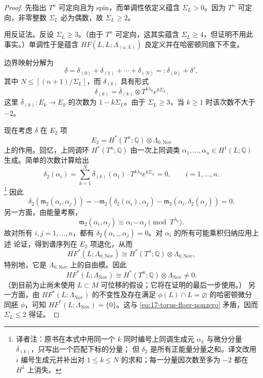 \begin{proof}
先指出 $T^n$ 可定向且为 spin，而单调性依定义蕴含 $\Sigma_L>0$。因为 $T^n$
可定向，非零整数 $\Sigma_L$ 必为偶数，故 $\Sigma_L\geq2$。

用反证法。反设 $\Sigma_L\geq3$。（由于 $T^n$ 可定向，这其实蕴含
$\Sigma_L\geq4$，但证明不用此事实。）单调性于是蕴含
$HF(L,L;\Lambda_{(\omega,L)})$ 良定义并在哈密顿同痕下不变。

边界映射分解为
\[
 \delta=\delta_{(0)}+\delta_{(1)}+\cdots+\delta_{(N)}
 =:\delta_{(0)}+\delta',
\]
其中 $N\leq[(n+1)/\Sigma_L]$，而 $\delta_{(k)}$ 具有形式
\begin{equation}
 \delta_{(k)}=\overline\delta_{(k)}\otimes T^{k\lambda_0}e^{k\Sigma_L}.
\label{eq:17-delta-k-monotone-torus}
\end{equation}
这里 $\overline\delta_{(k)}:E_k\to E_k$ 的次数为 $1-k\Sigma_L$。由于
$\Sigma_L\geq3$，当 $k\geq1$ 时该次数不大于 $-2$。

现在考虑 $\delta$ 在 $E_2$ 项
\[
 E_2=H^*(T^n;\mathbb Q)\otimes\Lambda_{0,\mathrm{Nov}}
\]
上的作用。回忆，上同调环 $H^*(T^n;\mathbb Q)$ 由一次上同调类
$\alpha_1,\ldots,\alpha_n\in H^1(L;\mathbb Q)$ 生成。简单的次数计算给出
\[
 \delta_2(\alpha_i)=\sum_{k=1}^{N}\overline\delta_{(k)}(\alpha_i)
 \cdot T^{k\lambda_0}e^{k\Sigma_L}=0,
 \qquad i=1,\ldots,n.
\]
\footnote{译者注：原书在本式中用同一个 $k$ 同时编号上同调生成元
$\alpha_k$ 与微分分量 $\overline\delta_{(k)}$，只写出一个匹配下标的分量；
但 $\delta_2$ 是所有正能量分量之和。译文改用 $i$ 编号生成元并补出对
$1\leq k\leq N$ 的求和；每一分量因次数至多为 $-2$ 都在 $H^1$ 上消失。}
因此
\[
 \delta_2(\mathfrak m_2(\alpha_i,\alpha_j))
 =-\mathfrak m_2(\delta_2(\alpha_i),\alpha_j)
 -\mathfrak m_2(\alpha_i,\delta_2(\alpha_j))=0.
\]
另一方面，由能量考察，
\[
 \mathfrak m_2(\alpha_i,\alpha_j)\equiv
 \alpha_i\smile\alpha_j\pmod{T^{\lambda_0}}.
\]
故对所有 $i,j=1,\ldots,n$，都有
$\delta_2(\alpha_i\smile\alpha_j)=0$。对 $\alpha_i$ 的所有可能乘积归纳应用上述
论证，得到谱序列在 $E_2$ 项退化，从而
\[
 HF^*(L;\Lambda_{0,\mathrm{Nov}})
 \cong H^*(T^n;\mathbb Q)\otimes\Lambda_{0,\mathrm{Nov}},
\]
特别地，它是 $\Lambda_{0,\mathrm{Nov}}$ 上的自由模。因此
\begin{equation}
 HF^*(L;\Lambda_{\mathrm{Nov}})
 \cong H^*(T^n;\mathbb Q)\otimes\Lambda_{\mathrm{Nov}}\neq0.
\label{eq:17-torus-floer-nonzero}
\end{equation}
（到目前为止尚未使用 $L\subset M$ 可位移的假设；它将在证明的最后一步使用。）
另一方面，由 $HF^*(L;\Lambda_{\mathrm{Nov}})$ 的不变性及存在满足
$\phi(L)\cap L=\varnothing$ 的哈密顿微分同胚 $\phi$，可知
$HF^*(L;\Lambda_{\mathrm{Nov}})=\{0\}$。这与
\eqref{eq:17-torus-floer-nonzero} 矛盾，因而 $\Sigma_L\leq2$ 得证。
\end{proof}

